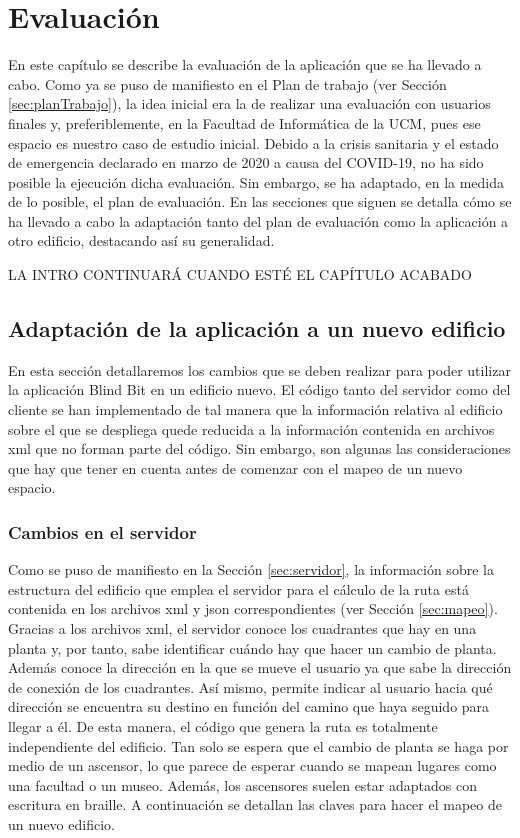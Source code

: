 \chapter{Evaluación}
\label{cap:evaluacion}

En este capítulo se describe la evaluación de la aplicación que se ha llevado a cabo. Como ya se puso de manifiesto en el Plan de trabajo (ver Sección \ref{sec:planTrabajo}), la idea inicial era la de realizar una evaluación con usuarios finales y, preferiblemente, en la Facultad de Informática de la UCM, pues ese espacio es nuestro caso de estudio inicial. Debido a la crisis sanitaria y el estado de emergencia declarado en marzo de 2020 a causa del COVID-19, no ha sido posible la ejecución dicha evaluación. Sin embargo, se ha adaptado, en la medida de lo posible, el plan de evaluación. En las secciones que siguen se detalla cómo se ha llevado a cabo la adaptación tanto del plan de evaluación como la aplicación a otro edificio, destacando así su generalidad. 

LA INTRO CONTINUARÁ CUANDO ESTÉ EL CAPÍTULO ACABADO


\section{Adaptación de la aplicación a un nuevo edificio}

En esta sección detallaremos los cambios que se deben realizar para poder utilizar la aplicación Blind Bit en un edificio nuevo. El código tanto del servidor como del cliente se han implementado de tal manera que la información relativa al edificio sobre el que se despliega quede reducida a la información contenida en archivos xml que no forman parte del código. Sin embargo, son algunas las consideraciones que hay que tener en cuenta antes de comenzar con el mapeo de un nuevo espacio. 

\subsection{Cambios en el servidor}
\label{sub:cambiosServidor}

Como se puso de manifiesto en la Sección \ref{sec:servidor}, la información sobre la estructura del edificio que emplea el servidor para el cálculo de la ruta está contenida en los archivos xml y json correspondientes (ver Sección \ref{sec:mapeo}). Gracias a los archivos xml, el servidor conoce los cuadrantes que hay en una planta y, por tanto, sabe identificar cuándo hay que hacer un cambio de planta. Además conoce la dirección en la que se mueve el usuario ya que sabe la dirección de conexión de los cuadrantes. Así mismo, permite indicar al usuario hacia qué dirección se encuentra su destino en función del camino que haya seguido para llegar a él. De esta manera, el código que genera la ruta es totalmente independiente del edificio. Tan solo se espera que el cambio de planta se haga por medio de un ascensor, lo que parece de esperar cuando se mapean lugares como una facultad o un museo. Además, los ascensores suelen estar adaptados con escritura en braille. A continuación se detallan las claves para hacer el mapeo de un nuevo edificio.

